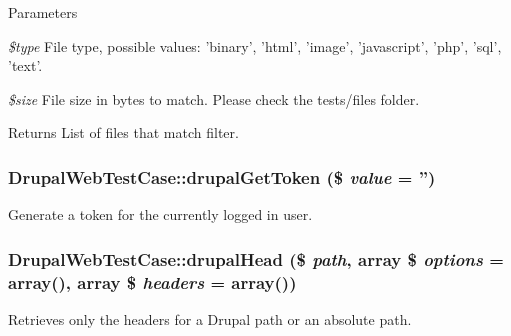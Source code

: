 \begin{DoxyParams}{Parameters}
\item[{\em \$type}]File type, possible values: 'binary', 'html', 'image', 'javascript', 'php', 'sql', 'text'. \item[{\em \$size}]File size in bytes to match. Please check the tests/files folder. \end{DoxyParams}
\begin{DoxyReturn}{Returns}
List of files that match filter. 
\end{DoxyReturn}
\hypertarget{classDrupalWebTestCase_a737d7788ee07da4f0184b6d489694070}{
\subsubsection[{drupalGetToken}]{\setlength{\rightskip}{0pt plus 5cm}DrupalWebTestCase::drupalGetToken (\$ {\em value} = {\ttfamily ''})}}
\label{classDrupalWebTestCase_a737d7788ee07da4f0184b6d489694070}
Generate a token for the currently logged in user. \hypertarget{classDrupalWebTestCase_adfed12ec9ae7e71a0de659894d5b171d}{
\subsubsection[{drupalHead}]{\setlength{\rightskip}{0pt plus 5cm}DrupalWebTestCase::drupalHead (\$ {\em path}, \/  array \$ {\em options} = {\ttfamily array()}, \/  array \$ {\em headers} = {\ttfamily array()})}}
\label{classDrupalWebTestCase_adfed12ec9ae7e71a0de659894d5b171d}
Retrieves only the headers for a Drupal path or an absolute path.


